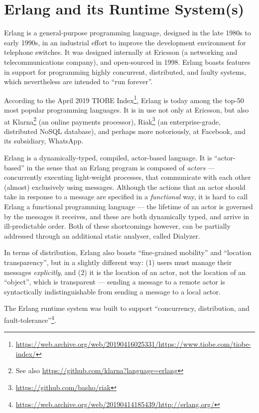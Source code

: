\section{Erlang and its Runtime System(s)}

Erlang is a general-purpose programming language, designed in the late
1980s to early 1990s, in an industrial effort to improve the
development environment for telephone switches\cite{erlang:hopl:2007}.
It was designed internally at Ericsson (a networking and
telecommunications company), and open-sourced in 1998. Erlang boasts
features in support for programming highly concurrent, distributed,
and faulty systems, which nevertheless are intended to ``run
forever''.

According to the April 2019 TIOBE
Index\footnote{\url{https://web.archive.org/web/20190416025331/https://www.tiobe.com/tiobe-index/}},
Erlang is today among the top-50 most popular programming languages.
It is in use not only at
Ericsson\cite{media:2018-03-31:Erlang-20-years}, but also at
Klarna\cite{media:2015-01-09:Klarna-Engineering-Insights}\footnote{See
also \url{https://github.com/klarna?language=erlang}} (an online
payments processor),
Riak\footnote{\url{https://github.com/basho/riak}} (an
enterprise-grade, distributed NoSQL database), and perhaps more
notoriously, at Facebook\cite{media:2008-03-13:facebook-chat}, and its
subsidiary, WhatsApp\cite{media:2014-02-21:Inside-Erlang}.

Erlang is a dynamically-typed, compiled, actor-based
language\cite{erlang:2019:Erlang-OTP}. It is ``actor-based'' in the
sense that an Erlang program is composed of \emph{actors} ---
concurrently executing light-weight processes, that communicate with
each other (almost) exclusively using messages.  Although the actions
that an actor should take in response to a message are specified in a
\emph{functional} way, it is hard to call Erlang a functional
programming language --- the lifetime of an actor is governed by the
messages it receives, and these are both dynamically typed, and arrive
in ill-predictable order. Both of these shortcomings however, can be
partially addressed through an additional static analyser, called
Dialyzer\cite{erlang:2019:Dialyzer}.

In terms of distribution, Erlang also boasts ``fine-grained mobility''
and ``location transparency'', but in a slightly different way: (1)
users must manage their messages \emph{explicitly}, and (2) it is the
location of an actor, not the location of an ``object'', which is
transparent --- sending a message to a remote actor is syntactically
indistinguishable from sending a message to a local actor.

The Erlang runtime system was built to support ``concurrency,
distribution, and
fault-tolerance''\footnote{\url{https://web.archive.org/web/20190414185439/http://erlang.org/}}.
